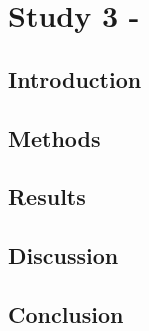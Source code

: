 \chapter{Study 3 - }
\label{label:S3}

\section{Introduction}
\label{label:S3_intro}

\section{Methods}
\label{label:S3_methods}

\section{Results}
\label{label:S3_results}

\section{Discussion}
\label{label:S3_discussion}

\section{Conclusion}
\label{label:S3_conclusion}